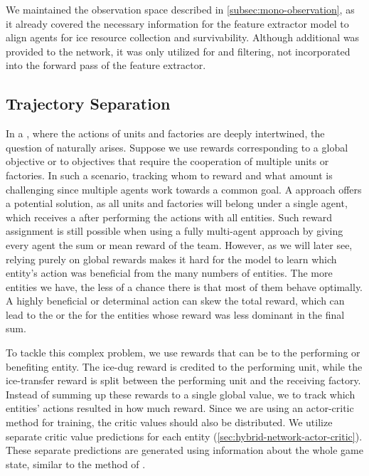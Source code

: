 \noindent We maintained the observation space described in \autoref{subsec:mono-observation}, as it already covered the necessary information for the feature extractor model to align agents for ice resource collection and survivability. Although additional  was provided to the network, it was only utilized for  and filtering, not incorporated into the forward pass of the feature extractor.

\subsection{Trajectory Separation} \label{subsec:grouping}

\noindent In a , where the actions of units and factories are deeply intertwined, the question of  naturally arises. Suppose we use rewards corresponding to a global objective or to objectives that require the cooperation of multiple units or factories. In such a scenario, tracking whom to reward and what amount is challenging since multiple agents work towards a common goal. A  approach offers a potential solution, as all units and factories will belong under a single agent, which receives a  after performing the actions with all entities. Such reward assignment is still possible when using a fully multi-agent approach by giving every agent the sum or mean reward of the team. \label{par:global-rew} However, as we will later see, relying purely on global rewards makes it hard for the model to learn which entity's action was beneficial from the many numbers of entities. The more entities we have, the less of a chance there is that most of them behave optimally. A highly beneficial or determinal action can skew the total reward, which can lead to the  or the  for the entities whose reward was less dominant in the final sum.

\bigskip

\noindent To tackle this complex problem, we use rewards that can be  to the performing or benefiting entity. The ice-dug reward is credited to the performing unit, while the ice-transfer reward is split between the performing unit and the receiving factory. Instead of summing up these rewards to a single global value, we  to track which entities' actions resulted in how much reward. Since we are using an actor-critic method for training, the critic values should also be distributed. We utilize separate critic value predictions for each entity (\autoref{sec:hybrid-network-actor-critic}). These separate predictions are generated using information about the whole game state, similar to the method of \cite{lowe2020multiagent}.


